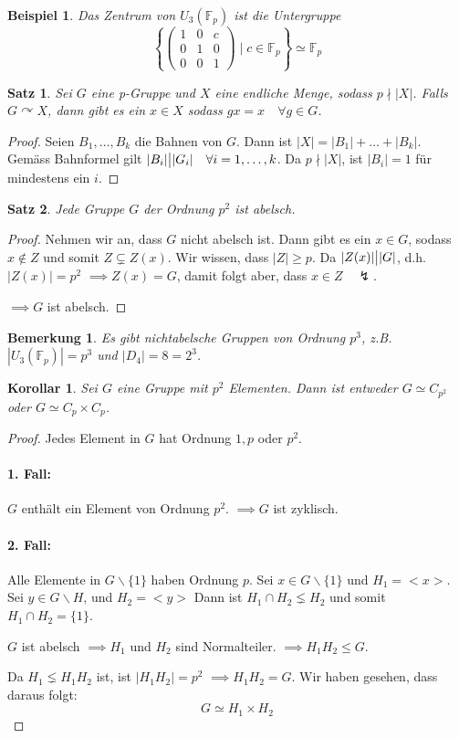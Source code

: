\documentclass{article}
\theoremstyle{plain}
\newtheorem{theorem}{Satz}
\newtheorem{corollary}{Korollar}
\newtheorem{beispiel}{Beispiel}
\newtheorem{bemerkung}{Bemerkung}
\newcommand{\F}{\mathbb{F}}
\newcommand{\ug}{\leq}
\newcommand{\zykl}[1]{{<}{#1}{>}}
\newcommand{\iso}{\simeq}
\newcommand{\operateson}{\curvearrowright}
\begin{document}
\begin{beispiel}
    Das Zentrum von $U_3(\F_p)$ ist die Untergruppe 
    $$\left\{\begin{pmatrix}
            1&0&c\\
            0&1&0\\
            0&0&1
        \end{pmatrix}\mid c\in \F_p\right\}\iso\F_p$$
\end{beispiel}
\begin{theorem}
    Sei $G$ eine p-Gruppe und $X$ eine endliche Menge, sodass $p\nmid |X|$.
    Falls $G \operateson X$, dann gibt es ein $x\in X$ sodass $gx=x\quad \forall g\in G$.
\end{theorem}
\begin{proof}
    Seien $B_1,\ldots,B_k$ die Bahnen von $G$. Dann ist $|X|=|B_1|+\ldots+|B_k|$.
    Gemäss Bahnformel gilt $|B_i|\big{|} |G_i|\quad \forall i=1,\ldots, k$.
    Da $p\nmid |X|$, ist $|B_i|=1$ für mindestens ein $i$.
\end{proof}

\begin{theorem}
    Jede Gruppe $G$ der Ordnung $p^2$ ist abelsch.
\end{theorem}
\begin{proof}
    Nehmen wir an, dass $G$ nicht abelsch ist. 
    Dann gibt es ein $x\in G$, sodass $x\notin Z$ und somit $Z\subsetneq Z(x)$.
    Wir wissen, dass $|Z|\geq p$.
    Da $|Z(x)|\big{|}|G|$, d.h.  $|Z(x)|=p^2$
    $\implies Z(x)=G$, damit folgt aber, dass $x\in Z\quad \lightning$.

    $\implies G$ ist abelsch.
\end{proof}
\begin{bemerkung}
    Es gibt nichtabelsche Gruppen von Ordnung $p^3$, z.B. $|U_3(\F_p)| = p^3$ und $|D_4| = 8 = 2^3$.
\end{bemerkung}
\begin{corollary}
    Sei $G$ eine Gruppe mit $p^2$ Elementen. Dann ist entweder $G\iso C_{p^2}$ oder $G \iso C_p\times C_p$.
\end{corollary}
\begin{proof}
    Jedes Element in $G$ hat Ordnung $1, p$ oder $p^2$.
    \paragraph{1. Fall:} $G$ enthält ein Element von Ordnung $p^2$. $\implies G$ ist zyklisch.
    \paragraph{2. Fall:} Alle Elemente in $G\backslash\{1\}$ haben Ordnung $p$.
    Sei $x\in G\backslash\{1\}$ und $H_1=\zykl{x}$. Sei $y\in G\backslash H$, und $H_2=\zykl{y}$
    Dann ist $H_1\cap H_2 \lneq H_2$
    und somit $H_1 \cap H_2 = \{1\}$.

    $G$ ist abelsch $\implies H_1$ und $H_2$ sind Normalteiler.
    $\implies H_1H_2 \ug G$.

    Da $H_1 \lneq H_1H_2$ ist, ist $|H_1H_2|=p^2$ $\implies H_1H_2=G$.
    Wir haben gesehen, dass daraus folgt:
    $$G\iso H_1\times H_2$$
\end{proof}
\end{document}
